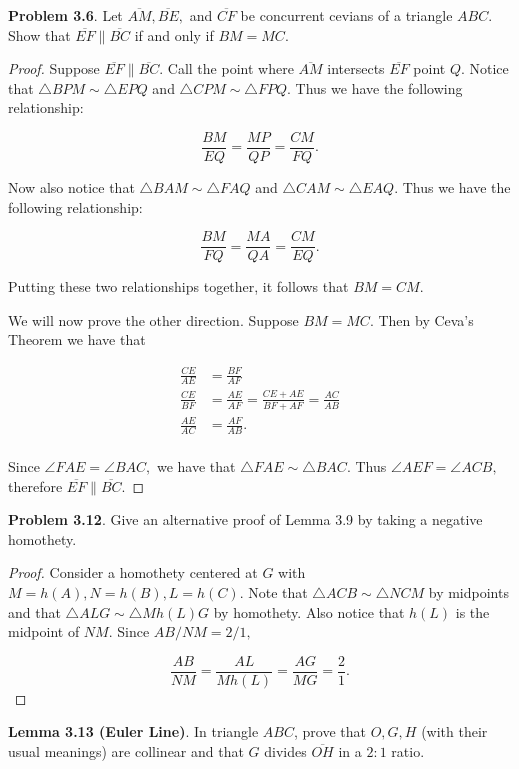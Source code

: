 \documentclass[letterpaper,oneside]{book}
\begin{document}
 \textbf{ Problem 3.6}.   Let $\overline{AM}, \overline{BE},$ and $\overline{CF}$ be concurrent cevians of a triangle $ABC.$ Show that $\overline{EF} \parallel \overline{BC}$ if and only if $BM = MC.$

 \begin{proof}
  Suppose $\overline{EF} \parallel \overline{BC}.$ Call the point where $\overline{AM}$ intersects $\overline{EF}$ point $Q.$ Notice that $\triangle BPM \sim \triangle EPQ$ and $\triangle CPM \sim \triangle FPQ.$ Thus we have the following relationship:

$$\frac{BM}{EQ} = \frac{MP}{QP} = \frac{CM}{FQ}.$$

Now also notice that $\triangle BAM \sim \triangle FAQ$ and $\triangle CAM \sim \triangle EAQ.$ Thus we have the following relationship:

$$\frac{BM}{FQ} = \frac{MA}{QA} = \frac{CM}{EQ}.$$

Putting these two relationships together, it follows that $BM=CM.$  

We will now prove the other direction. Suppose $BM=MC.$ Then by Ceva's Theorem we have that

\begin{align*} 
\frac{CE}{AE}&=\frac{BF}{AF}\\
\frac{CE}{BF}&=\frac{AE}{AF} = \frac{CE+AE}{BF+AF}=\frac{AC}{AB}\\
\frac{AE}{AC}&=\frac{AF}{AB}.\\
\end{align*}

Since $\angle FAE=\angle BAC,$ we have that $\triangle FAE \sim \triangle BAC.$ Thus $\angle AEF = \angle ACB,$ therefore $\overline{EF} \parallel \overline{BC}.$ \end{proof}



 \textbf{Problem 3.12}.   Give an alternative proof of Lemma 3.9 by taking a negative homothety.

\begin{proof}
  Consider a homothety centered at $G$ with $M=h(A), N=h(B), L = h(C).$ Note that $\triangle ACB \sim \triangle NCM$ by midpoints and that $\triangle {ALG} \sim \triangle {Mh(L)G}$ by homothety. Also notice that $h(L)$ is the midpoint of $NM.$ Since ${AB}/{NM} = 2/1,$

$$\frac{AB}{NM} = \frac{AL}{Mh(L)} = \frac{AG}{MG} = \frac21.$$
\end{proof}



  \textbf{Lemma 3.13 (Euler Line)}.   In triangle $ABC$, prove that $O, G, H$ (with their usual meanings) are collinear and that $G$ divides $\overline{OH}$ in a $2:1$ ratio.
\end{document}
